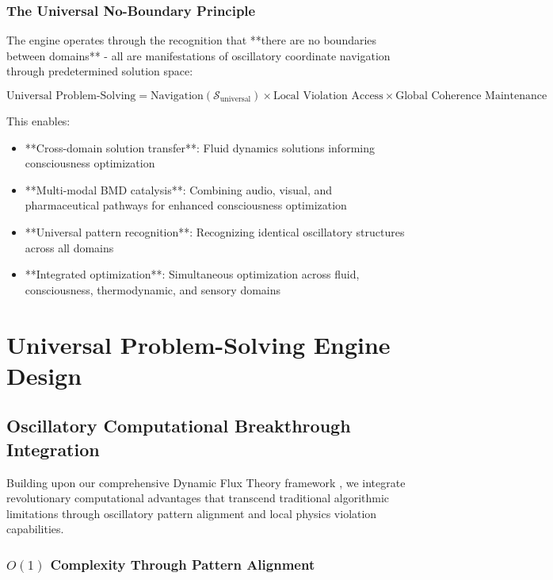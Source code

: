 \documentclass[11pt,a4paper]{article}
\theoremstyle{remark}
\begin{document}
\subsubsection{The Universal No-Boundary Principle}

The engine operates through the recognition that **there are no boundaries between domains** - all are manifestations of oscillatory coordinate navigation through predetermined solution space:

\begin{equation}
\text{Universal Problem-Solving} = \text{Navigation}(\mathcal{S}_{\text{universal}}) \times \text{Local Violation Access} \times \text{Global Coherence Maintenance}
\end{equation}

This enables:
\begin{itemize}
\item **Cross-domain solution transfer**: Fluid dynamics solutions informing consciousness optimization
\item **Multi-modal BMD catalysis**: Combining audio, visual, and pharmaceutical pathways for enhanced consciousness optimization
\item **Universal pattern recognition**: Recognizing identical oscillatory structures across all domains
\item **Integrated optimization**: Simultaneous optimization across fluid, consciousness, thermodynamic, and sensory domains
\end{itemize}

\section{Universal Problem-Solving Engine Design}

\subsection{Oscillatory Computational Breakthrough Integration}

Building upon our comprehensive Dynamic Flux Theory framework \cite{sachikonye2024flux}, we integrate revolutionary computational advantages that transcend traditional algorithmic limitations through oscillatory pattern alignment and local physics violation capabilities.

\subsubsection{$O(1)$ Complexity Through Pattern Alignment}
\end{document}
